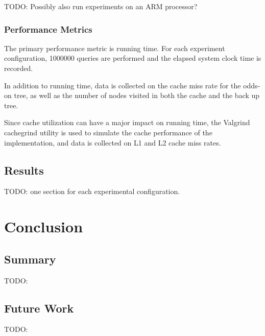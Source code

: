 \documentclass[mcs]{scsthesis}
\begin{document}
TODO: Possibly also run experiments on an ARM processor?

\subsection{Performance Metrics}

The primary performance metric is running time.  For each experiment
configuration, 1000000 queries are performed and the elapsed system clock
time is recorded.

In addition to running time, data is collected on the cache miss rate for the
odds-on tree, as well as the number of nodes visited in both the cache and the
back up tree.

Since cache utilization can have a major impact on running time, the Valgrind
\cite{valgrind} cachegrind utility is used to simulate the cache performance
of the implementation, and data is collected on L1 and L2 cache miss rates.

\section{Results}

TODO: one section for each experimental configuration.

\chapter{Conclusion}

\section{Summary}

TODO:

\section{Future Work}

TODO:
\end{document}
